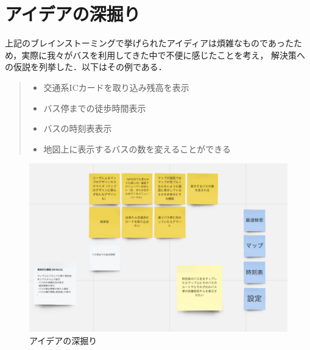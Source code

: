 \section{アイデアの深掘り}
上記のブレインストーミングで挙げられたアイディアは煩雑なものであったため，実際に我々がバスを利用してきた中で不便に感じたことを考え，
解決策への仮説を列挙した．以下はその例である．

\begin{quote}
    \begin{itemize}
        \item 交通系ICカードを取り込み残高を表示
        \item バス停までの徒歩時間表示
        \item バスの時刻表表示
        \item 地図上に表示するバスの数を変えることができる
    \end{itemize}
\end{quote}

\begin{figure}[H]
    \centering
    \includegraphics[width=14cm]{images/dig.png}
    \caption{アイデアの深掘り}
    \label{fig:dig}
\end{figure}

